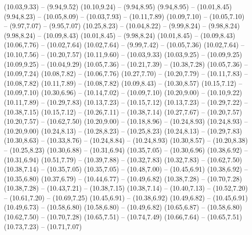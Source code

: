{  (10.03,9.33) -- (9.94,9.52)
  (10.10,9.24) -- (9.94,8.95)
  (9.94,8.95) -- (10.01,8.45)
  (9.94,8.23) -- (10.05,8.09) -- (10.03,7.93) -- (10.11,7.89)
  (10.09,7.10) -- (10.05,7.10) -- (9.97,7.07) -- (9.95,7.07)
  (10.25,8.23) -- (10.04,8.22) -- (9.99,8.24) -- (9.98,8.24)
  (9.98,8.24) -- (10.09,8.43)
  (10.01,8.45) -- (9.98,8.24)
  (10.01,8.45) -- (10.09,8.43)
  (10.06,7.76) -- (10.02,7.64)
  (10.02,7.64) -- (9.99,7.42) -- (10.05,7.36)
  (10.02,7.64) -- (10.10,7.56) -- (10.20,7.57)
  (10.11,9.60) -- (10.03,9.33)
  (10.03,9.25) -- (10.09,9.25)
  (10.09,9.25) -- (10.04,9.29)
  (10.05,7.36) -- (10.21,7.39) -- (10.38,7.28)
  (10.05,7.36) -- (10.09,7.24)
  (10.08,7.82) -- (10.06,7.76)
  (10.27,7.70) -- (10.20,7.79) -- (10.11,7.83) -- (10.08,7.82)
  (10.11,7.89) -- (10.08,7.82)
  (10.09,8.43) -- (10.30,8.57)
  (10.15,7.12) -- (10.09,7.10)
  (10.30,6.96) -- (10.14,7.02) -- (10.09,7.10)
  (10.20,9.00) -- (10.10,9.22)
  (10.11,7.89) -- (10.29,7.83)
  (10.13,7.23) -- (10.15,7.12)
  (10.13,7.23) -- (10.29,7.22) -- (10.38,7.15)
  (10.15,7.12) -- (10.26,7.11) -- (10.38,7.14)
  (10.27,7.67) -- (10.20,7.57)
  (10.20,7.57) -- (10.62,7.50)
  (10.20,9.00) -- (10.18,8.96) -- (10.24,8.93)
  (10.24,8.93) -- (10.20,9.00)
  (10.24,8.13) -- (10.28,8.23) -- (10.25,8.23)
  (10.24,8.13) -- (10.29,7.83)
  (10.30,8.63) -- (10.33,8.76) -- (10.24,8.84) -- (10.24,8.93)
  (10.30,8.57) -- (10.20,8.38) -- (10.25,8.23)
  (10.30,6.88) -- (10.31,6.94)
  (10.35,7.05) -- (10.30,6.96)
  (10.38,6.92) -- (10.31,6.94)
  (10.51,7.79) -- (10.39,7.88) -- (10.32,7.83)
  (10.32,7.83) -- (10.62,7.50)
  (10.38,7.14) -- (10.35,7.05)
  (10.35,7.05) -- (10.48,7.00) -- (10.45,6.91)
  (10.38,6.92) -- (10.35,6.80)
  (10.37,6.79) -- (10.44,6.77) -- (10.49,6.82)
  (10.38,7.28) -- (10.70,7.28)
  (10.38,7.28) -- (10.43,7.21) -- (10.38,7.15)
  (10.38,7.14) -- (10.40,7.13) -- (10.52,7.20) -- (10.61,7.20) -- (10.69,7.25)
  (10.45,6.91) -- (10.38,6.92)
  (10.49,6.82) -- (10.45,6.91)
  (10.49,6.73) -- (10.58,6.80)
  (10.58,6.80) -- (10.49,6.82)
  (10.65,6.87) -- (10.58,6.80)
  (10.62,7.50) -- (10.70,7.28)
  (10.65,7.51) -- (10.74,7.49)
  (10.66,7.64) -- (10.65,7.51)
  (10.73,7.23) -- (10.71,7.07)}


